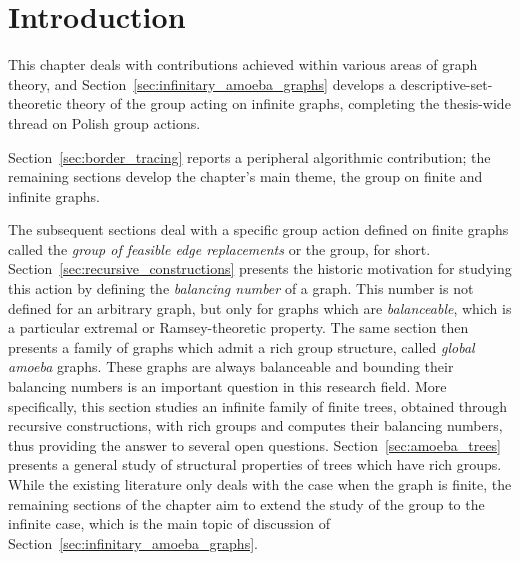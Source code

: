 
\section{Introduction}\label{sec:intro_group_actions}

This chapter deals with contributions achieved within various areas of graph theory, and Section~\ref{sec:infinitary_amoeba_graphs} develops a descriptive-set-theoretic theory of the \tFer group acting on infinite graphs, completing the thesis-wide thread on Polish group actions.

Section~\ref{sec:border_tracing} reports a peripheral algorithmic contribution; the remaining sections develop the chapter's main theme, the \tFer group on finite and infinite graphs.

The subsequent sections deal with a specific group action defined on finite graphs called the \emph{group of feasible edge replacements} or the \tFer group, for short.
Section~\ref{sec:recursive_constructions} presents the historic motivation for studying this action by defining the \emph{balancing number} of a graph.
This number is not defined for an arbitrary graph, but only for graphs which are \emph{balanceable}, which is a particular extremal or Ramsey-theoretic property.
The same section then presents a family of graphs which admit a rich \tFer group structure, called \emph{global amoeba} graphs.
These graphs are always balanceable and bounding their balancing numbers is an important question in this research field.
More specifically, this section studies an infinite family of finite trees, obtained through recursive constructions, with rich \tFer groups and computes their balancing numbers, thus providing the answer to several open questions.
Section~\ref{sec:amoeba_trees} presents a general study of structural properties of trees which have rich \tFer groups.
While the existing literature only deals with the case when the graph is finite, the remaining sections of the chapter aim to extend the study of the \tFer group to the infinite case, which is the main topic of discussion of Section~\ref{sec:infinitary_amoeba_graphs}.